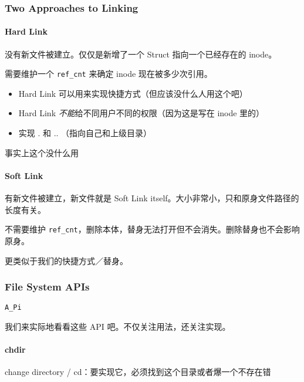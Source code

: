 \documentclass[
]{article}
\begin{document}
\hypertarget{header-n155}{%
\subsubsection{Two Approaches to Linking}\label{header-n155}}

\hypertarget{header-n156}{%
\paragraph{Hard Link}\label{header-n156}}

没有新文件被建立。仅仅是新增了一个 Struct 指向一个已经存在的 inode。

需要维护一个 \texttt{ref\_cnt} 来确定 inode 现在被多少次引用。

\begin{itemize}
\item
  Hard Link 可以用来实现快捷方式（但应该没什么人用这个吧）
\item
  Hard Link \emph{不能}给不同用户不同的权限（因为这是写在 inode 里的）
\item
  实现 . 和 .. （指向自己和上级目录）
\end{itemize}

事实上这个没什么用

\hypertarget{header-n167}{%
\paragraph{Soft Link}\label{header-n167}}

有新文件被建立，新文件就是 Soft Link
itself。大小非常小，只和原身文件路径的长度有关。

不需要维护
\texttt{ref\_cnt}，删除本体，替身无法打开但不会消失。删除替身也不会影响原身。

更类似于我们的快捷方式／替身。

\hypertarget{header-n171}{%
\subsubsection{File System APIs}\label{header-n171}}

\texttt{A\_Pi}

我们来实际地看看这些 API 吧。不仅关注用法，还关注实现。

\hypertarget{header-n174}{%
\paragraph{chdir}\label{header-n174}}

change directory / cd：要实现它，必须找到这个目录或者爆一个不存在错
\end{document}
